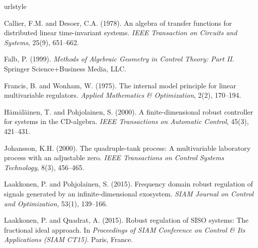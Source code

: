 \documentclass[11pt, a4paper]{amsart}
\begin{document}



\begin{thebibliography}{12}
	\providecommand{\natexlab}[1]{#1}
	\providecommand{\url}[1]{\texttt{#1}}
	\providecommand{\urlprefix}{URL }
	\expandafter\ifx\csname urlstyle\endcsname\relax
	\providecommand{\doi}[1]{doi:\discretionary{}{}{}#1}\else
	\providecommand{\doi}{doi:\discretionary{}{}{}\begingroup
		\urlstyle{rm}\Url}\fi
	
	Callier, F.M. and Desoer, C.A. (1978).
	\newblock An algebra of transfer functions for distributed linear
	time-invariant systems.
	\newblock \emph{IEEE Transaction on Circuits and Systems}, 25(9), 651--662.
	
	Falb, P. (1999).
	\newblock \emph{Methods of Algebraic Geometry in Control Theory: Part II}.
	\newblock Springer Science+Business Media, LLC.
	
	Francis, B. and Wonham, W. (1975).
	\newblock The internal model principle for linear multivariable regulators.
	\newblock \emph{Applied Mathematics \& Optimization}, 2(2), 170--194.
	
	H\"{a}m\"{a}l\"{a}inen, T. and Pohjolainen, S. (2000).
	\newblock A finite-dimensional robust controller for systems in the
	{CD}-algebra.
	\newblock \emph{IEEE Transactions on Automatic Control}, 45(3), 421--431.
	
	Johansson, K.H. (2000).
	\newblock The quadruple-tank process: A multivariable laboratory process with
	an adjustable zero.
	\newblock \emph{IEEE Transactions on Control Systems Technology}, 8(3),
	456--465.
	
	Laakkonen, P. and Pohjolainen, S. (2015).
	\newblock Frequency domain robust regulation of signals generated by an
	infinite-dimensional exosystem.
	\newblock \emph{SIAM Journal on Control and Optimization}, 53(1), 139--166.
	
	Laakkonen, P. and Quadrat, A. (2015).
	\newblock Robust regulation of {SISO} systems: The fractional ideal approach.
	\newblock In \emph{Proceedings of SIAM Conference on Control \& Its
		Applications (SIAM CT15)}. Paris, France.
	

\end{thebibliography}
\end{document}
